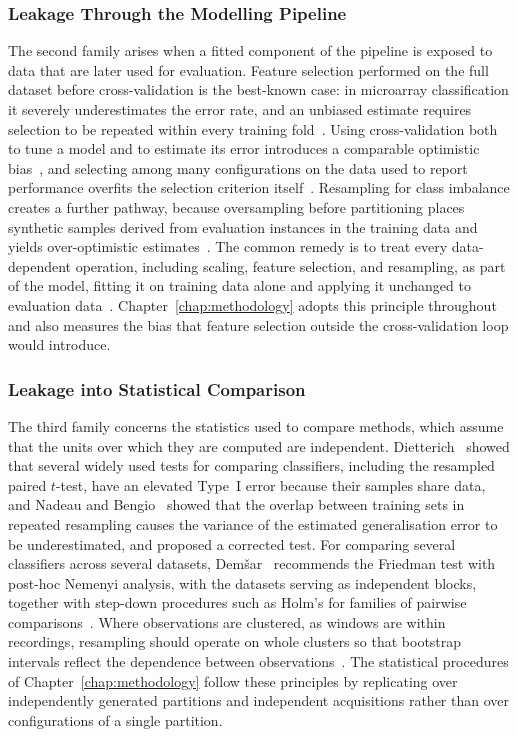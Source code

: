 \subsubsection{Leakage Through the Modelling Pipeline}
\label{sec:chap2LeakPipeline}
The second family arises when a fitted component of the pipeline is exposed to data that are later used for evaluation. Feature selection performed on the full dataset before cross-validation is the best-known case: in microarray classification it severely underestimates the error rate, and an unbiased estimate requires selection to be repeated within every training fold~\cite{ambroise2002selection}. Using cross-validation both to tune a model and to estimate its error introduces a comparable optimistic bias~\cite{varma2006bias}, and selecting among many configurations on the data used to report performance overfits the selection criterion itself~\cite{cawley2010overfitting}. Resampling for class imbalance creates a further pathway, because oversampling before partitioning places synthetic samples derived from evaluation instances in the training data and yields over-optimistic estimates~\cite{santos2018imbalanced}. The common remedy is to treat every data-dependent operation, including scaling, feature selection, and resampling, as part of the model, fitting it on training data alone and applying it unchanged to evaluation data~\cite{kapoor2023leakage}. Chapter~\ref{chap:methodology} adopts this principle throughout and also measures the bias that feature selection outside the cross-validation loop would introduce.

\subsubsection{Leakage into Statistical Comparison}
\label{sec:chap2LeakStatistics}
The third family concerns the statistics used to compare methods, which assume that the units over which they are computed are independent. Dietterich~\cite{dietterich1998tests} showed that several widely used tests for comparing classifiers, including the resampled paired $t$-test, have an elevated Type~I error because their samples share data, and Nadeau and Bengio~\cite{nadeau2003inference} showed that the overlap between training sets in repeated resampling causes the variance of the estimated generalisation error to be underestimated, and proposed a corrected test. For comparing several classifiers across several datasets, Dem\v{s}ar~\cite{demsar2006statistical} recommends the Friedman test with post-hoc Nemenyi analysis, with the datasets serving as independent blocks, together with step-down procedures such as Holm's for families of pairwise comparisons~\cite{holm1979simple}. Where observations are clustered, as windows are within recordings, resampling should operate on whole clusters so that bootstrap intervals reflect the dependence between observations~\cite{field2007clustered}. The statistical procedures of Chapter~\ref{chap:methodology} follow these principles by replicating over independently generated partitions and independent acquisitions rather than over configurations of a single partition.

